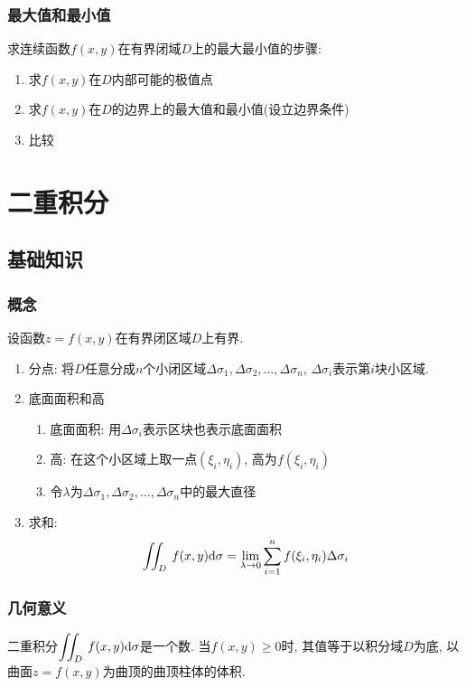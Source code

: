 \subsection{最大值和最小值}
求连续函数$ f(x,y) $在有界闭域$ D $上的最大最小值的步骤:
\begin{enumerate}
    \item 求$ f(x,y) $在$ D $内部可能的极值点
    \item 求$ f(x,y) $在$ D $的边界上的最大值和最小值(设立边界条件)
    \item 比较
\end{enumerate}
\chapter{二重积分}
\section{基础知识}
\subsection{概念}
设函数$ z=f(x,y) $在有界闭区域$ D $上有界.
\begin{enumerate}
    \item 分点: 将$ D $任意分成$ n $个小闭区域$ \Delta \sigma_{1}, \Delta \sigma_{2},...,\Delta \sigma_{n} $, $ \Delta \sigma_{i} $表示第$ i $块小区域.
    \item 底面面积和高
          \begin{enumerate}
              \item 底面面积: 用$ \Delta\sigma_{i} $表示区块也表示底面面积
              \item 高: 在这个小区域上取一点$ (\xi_{i},\eta_{i}) $, 高为$ f(\xi_{i},\eta_{i}) $
              \item 令$ \lambda $为$ \Delta \sigma_{1}, \Delta \sigma_{2},...,\Delta \sigma_{n} $中的最大直径
          \end{enumerate}
    \item 求和:
          \begin{equation*}
              \displaystyle\iint_{D}^{}\hspace{.2em}f(x,y)\mathrm{d}\sigma=\lim\limits_{\lambda \rightarrow 0}\sum_{i=1}^{n}f(\xi_{i},\eta_{i})\Delta \sigma_{i}
          \end{equation*}
\end{enumerate}
\subsection{几何意义}
二重积分$ \displaystyle\iint_{D}^{}\hspace{.2em}f(x,y)\mathrm{d}\sigma $是一个数. 当$ f(x,y)\ge 0 $时, 其值等于以积分域$ D $为底, 以曲面$ z=f(x,y) $为曲顶的曲顶柱体的体积.
